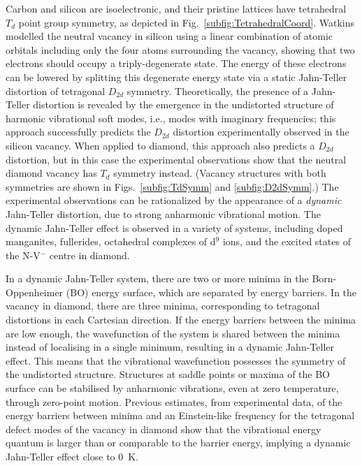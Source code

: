 \documentclass[aps,showpacs,prb,reprint,superscriptaddress,longbibliography]{revtex4-1}
\begin{document}
Carbon and silicon are isoelectronic, and their pristine lattices have
tetrahedral $T_d$ point group symmetry, as depicted in Fig.\
\ref{subfig:TetrahedralCoord}. Watkins modelled the neutral vacancy in
silicon using a linear combination of atomic orbitals including only
the four atoms surrounding the vacancy,\cite{watkins_lattice_1986}
showing that two electrons should occupy a triply-degenerate
state. The energy of these electrons can be lowered by splitting this
degenerate energy state via a static Jahn-Teller
distortion\cite{jahn_stability_1937,watkins_lattice_1986} of
tetragonal $D_{2d}$
symmetry.\cite{corsetti_system-size_2011,probert_improving_2003,breuer_ab_1995}
Theoretically, the presence of a Jahn-Teller distortion is revealed by
the emergence in the undistorted structure of harmonic vibrational
soft modes, i.e., modes with imaginary frequencies; this approach
successfully predicts the $D_{2d}$ distortion experimentally observed
in the silicon vacancy. When applied to diamond, this approach also
predicts a $D_{2d}$ distortion, but in this case the experimental
observations show that the neutral diamond vacancy has $T_d$ symmetry
instead.\cite{davies_jahn-teller_1981,clark_neutral_1973} (Vacancy
structures with both symmetries are shown in Figs.\
\ref{subfig:TdSymm} and \ref{subfig:D2dSymm}.)  The experimental
observations can be rationalized by the appearance of a {\it dynamic}
Jahn-Teller
distortion,\cite{davies_jahn-teller_1981,lannoo_optical_1968,breuer_ab_1995,ham_jahn-teller_1971}
due to strong anharmonic vibrational motion. The dynamic Jahn-Teller
effect is observed in a variety of systems, including doped
manganites,\cite{millis_dynamic_1996,dediu_jahn-teller_2000}
fullerides,\cite{brouet_role_2001,canton_experimental_2002} octahedral
complexes of d$^9$ ions,\cite{o-brien_dynamic_1964} and the excited
states of the N-V$^-$ centre in diamond.\cite{fu_observation_2009}

In a dynamic Jahn-Teller system, there are two or more minima in the
Born-Oppenheimer (BO) energy surface, which are separated by energy
barriers. In the vacancy in diamond, there are three minima,
corresponding to tetragonal distortions in each Cartesian
direction. If the energy barriers between the minima are low enough,
the wavefunction of the system is shared between the minima instead of
localising in a single minimum, resulting in a dynamic Jahn-Teller
effect. This means that the vibrational wavefunction possesses the
symmetry of the undistorted structure.\cite{ham_jahn-teller_1971}
Structures at saddle points or maxima of the BO surface can be
stabilised by anharmonic vibrations, even at zero temperature, through
zero-point motion.  Previous estimates, from experimental data, of the
energy barriers between minima and an Einstein-like frequency for the
tetragonal defect modes of the vacancy in diamond show that the
vibrational energy quantum is larger than or comparable to the barrier
energy, implying a dynamic Jahn-Teller effect close to
$0$~K.\cite{stoneham_low-lying_1977}
\end{document}
